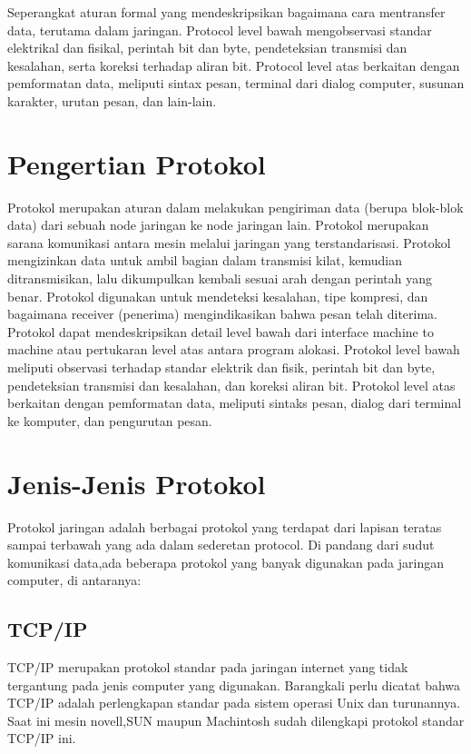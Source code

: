  Seperangkat aturan formal yang mendeskripsikan bagaimana cara mentransfer data, terutama dalam jaringan. Protocol level bawah
 mengobservasi standar elektrikal dan fisikal, perintah bit dan byte, pendeteksian transmisi dan kesalahan, serta koreksi terhadap 
 aliran bit. Protocol level atas berkaitan dengan pemformatan data, meliputi sintax pesan, terminal dari dialog computer, susunan 
 karakter, urutan pesan, dan lain-lain.
 
 \section{Pengertian Protokol}
Protokol merupakan aturan dalam melakukan pengiriman data (berupa blok-blok data) dari sebuah node jaringan ke node jaringan lain.
Protokol merupakan sarana komunikasi antara mesin melalui jaringan yang terstandarisasi. Protokol mengizinkan data untuk ambil bagian dalam transmisi kilat, kemudian ditransmisikan, lalu dikumpulkan kembali sesuai arah dengan perintah yang benar. 
Protokol digunakan untuk mendeteksi kesalahan, tipe kompresi, dan bagaimana receiver (penerima) mengindikasikan bahwa pesan telah diterima. 
Protokol dapat mendeskripsikan detail level bawah dari interface machine to machine atau pertukaran level atas antara program alokasi. 
Protokol level bawah meliputi observasi terhadap standar elektrik dan fisik, perintah bit dan byte, pendeteksian transmisi dan kesalahan, dan koreksi aliran bit. 
Protokol level atas berkaitan dengan pemformatan data, meliputi sintaks pesan, dialog dari terminal ke komputer, dan pengurutan pesan. 
 
 \section{Jenis-Jenis Protokol}
Protokol jaringan adalah berbagai protokol yang terdapat dari lapisan  teratas sampai terbawah yang ada dalam sederetan protocol.
Di pandang dari sudut komunikasi data,ada beberapa protokol yang banyak digunakan pada jaringan computer, di antaranya:

 \subsection{TCP/IP}
TCP/IP merupakan protokol standar pada jaringan internet yang tidak tergantung pada jenis computer yang digunakan.
Barangkali perlu dicatat bahwa TCP/IP adalah perlengkapan standar pada sistem operasi Unix dan turunannya.
Saat ini mesin novell,SUN maupun Machintosh sudah dilengkapi protokol standar TCP/IP ini.

